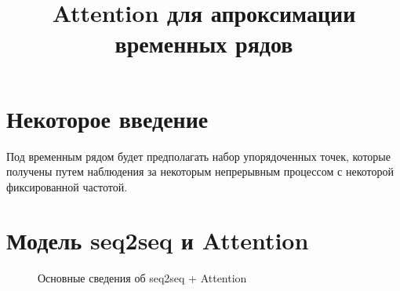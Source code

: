 \documentclass[11pt, a4paper]{article}
\begin{document}
\title{\bf Attention для апроксимации временных рядов}
\date{}
\author{}
\maketitle

\section{Некоторое введение}
Под временным рядом будет предполагать набор упорядоченных точек, которые получены путем наблюдения за некоторым непрерывным процессом с некоторой фиксированной частотой.

\section{Модель seq2seq и Attention}

\begin{figure}[h!]\center
{}
\caption{Основные сведения об seq2seq + Attention}
\end{figure}
\end{document}
